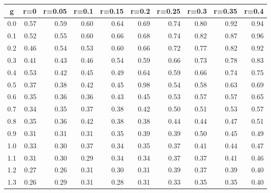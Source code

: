 %
\begin{table}[!tbp]
 \begin{center}
 \begin{tabular}{rrrrrrrrrr}\hline\hline
\multicolumn{1}{c}{g}&\multicolumn{1}{c}{r=0}&\multicolumn{1}{c}{r=0.05}&\multicolumn{1}{c}{r=0.1}&\multicolumn{1}{c}{r=0.15}&\multicolumn{1}{c}{r=0.2}&\multicolumn{1}{c}{r=0.25}&\multicolumn{1}{c}{r=0.3}&\multicolumn{1}{c}{r=0.35}&\multicolumn{1}{c}{r=0.4}\tabularnewline
\hline
0.0&0.57&0.59&0.60&0.64&0.69&0.74&0.80&0.92&0.94\tabularnewline
0.1&0.52&0.55&0.60&0.66&0.68&0.74&0.82&0.87&0.96\tabularnewline
0.2&0.46&0.54&0.53&0.60&0.66&0.72&0.77&0.82&0.92\tabularnewline
0.3&0.41&0.43&0.46&0.54&0.59&0.66&0.73&0.78&0.83\tabularnewline
0.4&0.53&0.42&0.45&0.49&0.64&0.59&0.66&0.74&0.75\tabularnewline
0.5&0.37&0.38&0.42&0.45&0.98&0.54&0.58&0.63&0.69\tabularnewline
0.6&0.35&0.36&0.36&0.43&0.45&0.53&0.57&0.57&0.65\tabularnewline
0.7&0.34&0.35&0.37&0.38&0.42&0.50&0.51&0.53&0.57\tabularnewline
0.8&0.35&0.36&0.42&0.38&0.38&0.44&0.44&0.47&0.51\tabularnewline
0.9&0.31&0.31&0.31&0.35&0.39&0.39&0.50&0.45&0.49\tabularnewline
1.0&0.33&0.30&0.37&0.34&0.35&0.37&0.41&0.44&0.47\tabularnewline
1.1&0.31&0.30&0.29&0.34&0.34&0.37&0.37&0.41&0.46\tabularnewline
1.2&0.27&0.26&0.31&0.30&0.31&0.39&0.37&0.39&0.40\tabularnewline
1.3&0.26&0.29&0.31&0.28&0.31&0.33&0.35&0.35&0.40\tabularnewline
\hline
\end{tabular}

\end{center}

\end{table}

